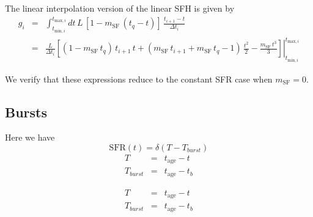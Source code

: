 \documentclass[12pt, letterpaper, preprint]{aastex}
\newcommand{\tmin}[1][]{t_{\mathrm{min} #1}}
\newcommand{\tmax}[1][]{t_{\mathrm{max} #1}}
\newcommand{\dt}{\Delta t_i}
\newcommand{\tintegral}{\int_{\tmin[,i]}^{\tmax[,i]} dt}
\newcommand{\tinterval}{\right|_{\tmin[,i]}^{\tmax[,i]}}
\newcommand{\tage}{t_{\mathrm{age}}}
\newcommand{\sfslope}{m_{\mathrm{SF}}}
\begin{document}
The linear interpolation version of the linear SFH is given by 
\begin{eqnarray}
g_i  & = & \tintegral \,  L\, \left[1 - \sfslope \, (t_q - t)\right] \, \frac{t_{i+1} - t}{\dt}  \nonumber \\
      & = & \frac{L}{\dt} \left.\left[(1-\sfslope\, t_q) \, t_{i+1} \, t + \left(\sfslope\, t_{i+1} + \sfslope \, t_q -1\right)\, \frac{t^2}{2} - \frac{\sfslope\, t^3}{3}\right] \tinterval
\end{eqnarray}

We verify that these expressions reduce to the constant SFR case when $\sfslope=0$.

\subsection{Bursts}

Here we have 
\[ 
\mathrm{SFR}(t) = \delta(T - T_{burst})
\]
\begin{eqnarray}
T & = & \tage - t \nonumber \\
T_{burst} & = & \tage - t_b
\end{eqnarray}

\begin{eqnarray}
T & = & \tage - t \nonumber \\
T_{burst} & = & \tage - t_b
\end{eqnarray}
\end{document}
